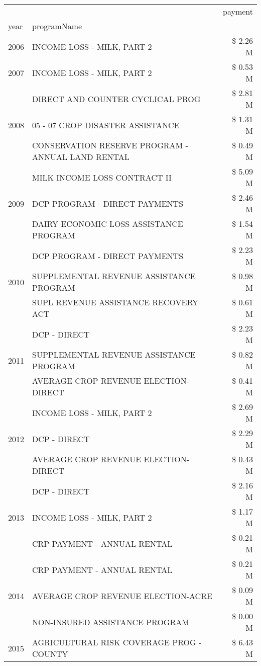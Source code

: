 \begin{tabular}{llr}
\toprule
 &  & payment \\
year & programName &  \\
\midrule
2006 & INCOME LOSS - MILK, PART 2 & \$ 2.26 M \\
\cline{1-3}
2007 & INCOME LOSS - MILK, PART 2 & \$ 0.53 M \\
\cline{1-3}
\multirow[t]{3}{*}{2008} & DIRECT AND COUNTER CYCLICAL PROG & \$ 2.81 M \\
 & 05 - 07 CROP DISASTER ASSISTANCE & \$ 1.31 M \\
 & CONSERVATION RESERVE PROGRAM - ANNUAL LAND RENTAL & \$ 0.49 M \\
\cline{1-3}
\multirow[t]{3}{*}{2009} & MILK INCOME LOSS CONTRACT II & \$ 5.09 M \\
 & DCP PROGRAM - DIRECT PAYMENTS & \$ 2.46 M \\
 & DAIRY ECONOMIC LOSS ASSISTANCE PROGRAM & \$ 1.54 M \\
\cline{1-3}
\multirow[t]{3}{*}{2010} & DCP PROGRAM - DIRECT PAYMENTS & \$ 2.23 M \\
 & SUPPLEMENTAL REVENUE ASSISTANCE PROGRAM & \$ 0.98 M \\
 & SUPL REVENUE ASSISTANCE RECOVERY ACT & \$ 0.61 M \\
\cline{1-3}
\multirow[t]{3}{*}{2011} & DCP - DIRECT & \$ 2.23 M \\
 & SUPPLEMENTAL REVENUE ASSISTANCE PROGRAM & \$ 0.82 M \\
 & AVERAGE CROP REVENUE ELECTION-DIRECT & \$ 0.41 M \\
\cline{1-3}
\multirow[t]{3}{*}{2012} & INCOME LOSS - MILK, PART 2 & \$ 2.69 M \\
 & DCP - DIRECT & \$ 2.29 M \\
 & AVERAGE CROP REVENUE ELECTION-DIRECT & \$ 0.43 M \\
\cline{1-3}
\multirow[t]{3}{*}{2013} & DCP - DIRECT & \$ 2.16 M \\
 & INCOME LOSS - MILK, PART 2 & \$ 1.17 M \\
 & CRP PAYMENT - ANNUAL RENTAL & \$ 0.21 M \\
\cline{1-3}
\multirow[t]{3}{*}{2014} & CRP PAYMENT - ANNUAL RENTAL & \$ 0.21 M \\
 & AVERAGE CROP REVENUE ELECTION-ACRE & \$ 0.09 M \\
 & NON-INSURED ASSISTANCE PROGRAM & \$ 0.00 M \\
\cline{1-3}
\multirow[t]{3}{*}{2015} & AGRICULTURAL RISK COVERAGE PROG - COUNTY & \$ 6.43 M \\

\end{tabular}
